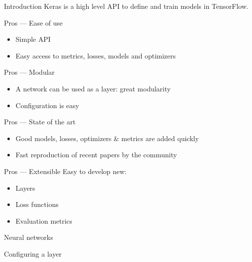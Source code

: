 \begin{frame}{Introduction}
  Keras is a high level API to define and train models in TensorFlow.

\end{frame}

\begin{frame}{Pros --- Ease of use}
  \begin{itemize}
    \item Simple API
    \item Easy access to metrics, losses, models and optimizers
  \end{itemize}
\end{frame}

\begin{frame}{Pros --- Modular}
  \begin{itemize}
    \item A network can be used as a layer: great modularity
    \item Configuration is easy
  \end{itemize}
\end{frame}

\begin{frame}{Pros --- State of the art}
  \begin{itemize}
    \item Good models, losses, optimizers \& metrics are added quickly
    \item Fast reproduction of recent papers by the community
  \end{itemize}
\end{frame}

\begin{frame}{Pros --- Extensible}
  Easy to develop new:
  \begin{itemize}
    \item Layers
    \item Loss functions
    \item Evaluation metrics
  \end{itemize}
\end{frame}

\begin{frame}{Neural networks}
\end{frame}

\begin{frame}{Configuring a layer}
\end{frame}


